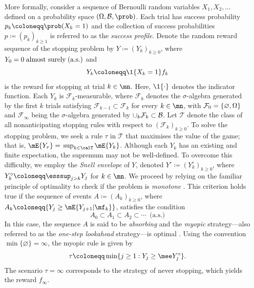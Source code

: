 \documentclass[11pt]{article}
\begin{document}
	
	More formally, consider a sequence of  Bernoulli random variables  $X_1, X_2, \ldots$ defined on a probability space $(\Omega, {\cal B}, \prob)$. Each trial has success probability  $p_k \coloneqq \prob(X_k=1)$ and the collection of success probabilities $p \coloneqq(p_k)_{ k \ge 1}$ is referred to as the \textit{success profile}.	Denote the random reward sequence of the stopping problem by  $Y\coloneqq(Y_k)_{k \ge 0}$, where  $Y_0 = 0 \;\text{almost surely} \;(\rm a.s.)$ and 
	\begin{equation}\label{def.payoof}
			Y_k \coloneqq  \1\{X_k = 1\} f_k
	\end{equation}
	is the reward for stopping at trial $k \in \mn$. Here,	$\1\{\cdot\}$ denotes the indicator function.	Each $Y_k$ is $\mathcal{F}_k$-measurable, where  $\mathcal{F}_k$ denotes the $\sigma$-algebra  generated by the first $k$ trials satisfying  $\mathcal{F}_{k-1} \subset \mathcal{F}_{k}$ for every $k \in \mn$, with ${\cal F}_0=\{ \varnothing, \Omega\}$ and  $\mathcal{F}_\infty$ being the $\sigma$-algebra generated by $\cup_k \mathcal{F}_k\subset \cal B$.  Let $\mathcal{T}$ denote the class of all nonanticipating stopping rules with respect to  $(\mathcal{F}_k)_{k \ge 0}$. To solve the stopping problem, we seek a rule $\tau$ in $\mathcal{T}$ that maximises the value of the game; that is,  $\mE{Y_\tau} =\,\sup_{k \in \calT} \mE{Y_k}$. Although each $Y_k$ has an existing and finite expectation, the supremum may not be well-defined. To overcome this difficulty, we employ   the \textit{Snell envelope} of $Y$, denoted  $Y^\circ\coloneqq(Y^\circ_k)_{ k \ge 0}$, where $	Y^\circ_k \coloneqq  \esssup_{j > k} Y_j$ for $k \in \mn$. We proceed by relying on the familiar principle of optimality to check if the problem is  \textit{monotone} \cite{CRS}. This criterion holds true if the sequence of events $A \coloneqq (A_k)_{k \ge 0}$, where $A_k \coloneqq \{ Y_j \ge \mE{Y_{j+1} | \mf_k}\}$,  satisfies the condition $$A_{0} \subset A_{1}\subset A_{2} \subset \cdots ~\;\text{(a.s.)}$$ In this case, the sequence $A$ is said to be  \textit{absorbing} and	the \textit{myopic} strategy---also referred to as the \textit{one-step lookahead} strategy---is optimal \cite{FergusonBook}. Using the convention $\min \{\varnothing\} = \infty$, the myopic rule  is  given by
	\begin{equation*}
		\tau \coloneqq \min\{ j \ge 1:  Y_j \ge \mee Y^\circ_j \}.
	\end{equation*}
The scenario $\tau=\infty$ corresponds to the strategy of never stopping, which yields the reward $f_\infty$. 
\end{document}
